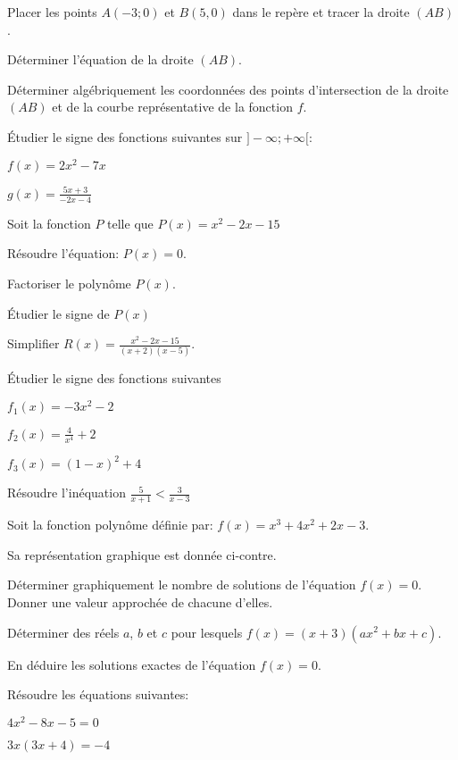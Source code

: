 \documentclass[a4paper,12pt]{scrartcl}
\begin{document}
	\question{}
	Placer les points $A(-3;0)$ et $B(5,0)$ dans le repère et tracer la droite $(AB)$.
	
	\question{}
Déterminer l'équation de la droite $(AB)$.
	
	\question{}
Déterminer algébriquement les coordonnées des points d'intersection de la droite $(AB)$ et de la courbe représentative de la fonction $f$.

\exo{}
Étudier le signe des fonctions suivantes sur $]-\infty ;+\infty[$:
	
\question{}
$f(x) = 2x^2 - 7x$
	
\question{}
$g(x) = \frac{5x+3}{-2x-4}$

\exo{}
Soit la fonction $P$ telle que $P(x) = x^2 - 2x - 15$
	
\question{}
Résoudre  l'équation: $P(x) = 0$.
	
\question{}
Factoriser le polynôme $P(x)$.
	
\question{}
Étudier le signe de $P(x)$
	
\question{}
Simplifier $R(x) = \frac{x^2 - 2x - 15}{(x+2)(x-5)}$.

\exo{}
Étudier le signe des fonctions suivantes 
	
\question{}
$f_1(x) = -3x^2 - 2$
	
\question{}
$f_2(x) = \frac{4}{x^4} + 2$
	
\question{}
$f_3(x) = (1-x)^2 + 4$

\exo{}
Résoudre l'inéquation $\frac{5}{x+1} < \frac{3}{x-3}$

\exo{}
Soit la fonction polynôme définie par: $f(x) = x^3 + 4x^2 + 2x -3$.

Sa représentation graphique est donnée ci-contre.

\begin{center}
\end{center}
	
\question{}
Déterminer graphiquement le nombre de solutions de l'équation $f(x) = 0$. Donner une valeur approchée de chacune d'elles.

\question{}
Déterminer des réels $a$, $b$ et $c$ pour lesquels $f(x) = (x + 3) (ax^2 + bx + c)$.

\question{}
En déduire les solutions exactes de l'équation $f(x) = 0$.

\exo{}
Résoudre les équations suivantes:

\question{}
$4x^2 - 8x - 5 = 0$

\question{}
$3x (3x + 4)  = -4$
\end{document}
